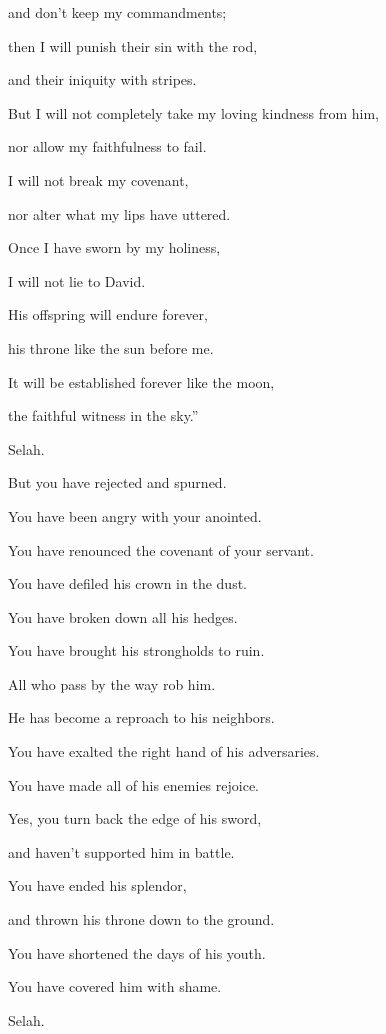 {\par }{\QB and don’t keep my commandments;
\par }{\Q {}then I will punish their sin with the rod,
\par }{\QB and their iniquity with stripes.
\par }{\Q {}But I will not completely take my loving kindness from him,
\par }{\QB nor allow my faithfulness to fail.
\par }{\Q {}I will not break my covenant,
\par }{\QB nor alter what my lips have uttered.
\par }{\Q {}Once I have sworn by my holiness,
\par }{\QB I will not lie to David.
\par }{\Q {}His offspring will endure forever,
\par }{\QB his throne like the sun before me.
\par }{\Q {}It will be established forever like the moon,
\par }{\QB the faithful witness in the sky.”
\par }{\QS Selah.\par }
{\BB \par }{\Q {}But you have rejected and spurned.
\par }{\QB You have been angry with your anointed.
\par }{\Q {}You have renounced the covenant of your servant.
\par }{\QB You have defiled his crown in the dust.
\par }{\Q {}You have broken down all his hedges.
\par }{\QB You have brought his strongholds to ruin.
\par }{\Q {}All who pass by the way rob him.
\par }{\Q He has become a reproach to his neighbors.
\par }{\Q {}You have exalted the right hand of his adversaries.
\par }{\QB You have made all of his enemies rejoice.
\par }{\Q {}Yes, you turn back the edge of his sword,
\par }{\QB and haven’t supported him in battle.
\par }{\Q {}You have ended his splendor,
\par }{\QB and thrown his throne down to the ground.
\par }{\Q {}You have shortened the days of his youth.
\par }{\QB You have covered him with shame.
\par }{\QS Selah.\par }
